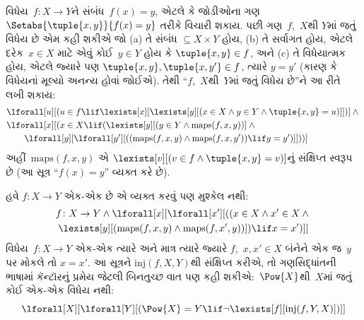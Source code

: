 વિધેય~$f\colon X\to Y$ને સંબંધ~$f(x)=y$, એટલે કે જોડીઓના ગણ
$\Setabs{\tuple{x,y}}{f(x)=y}$ તરીકે વિચારી શકાય. પછી ગણ~$f$,~$X$થી
$Y$માં જતું વિધેય છે એમ કહી શકીએ જો (a) તે સંબંધ
$\subseteq X\times Y$ હોય, (b) તે સર્વાગત હોય, એટલે દરેક~$x\in X$
માટે એવું કોઈ~$y\in Y$ હોય કે $\tuple{x,y}\in f$, અને (c) તે
વિધેયાત્મક હોય, એટલે જ્યારે પણ
$\tuple{x,y},\tuple{x,y'}\in f$, ત્યારે $y=y'$ (કારણ કે વિધેયનાં
મૂલ્યો અનન્ય હોવાં જોઈએ). તેથી ``$f$,~$X$થી~$Y$માં જતું વિધેય છે''ને
આ રીતે લખી શકાય:
\begin{align*}
& \lforall[u][(u \in f \lif
   \lexists[x][\lexists[y][(x \in X \land y \in
      Y \land \tuple{x, y} = u)]])] \land {}\\
& \lforall[x][(x \in X \lif
   (\lexists[y][(y \in Y \land \mathrm{maps}(f, x, y))] \land {}\\
&\qquad \lforall[y][\lforall[y'][((\mathrm{maps}(f, x, y) \land
    \mathrm{maps}(f, x, y')) \lif y = y')]]))]
\end{align*}
અહીં~$\mathrm{maps}(f,x,y)$ એ
$\lexists[v][(v\in f\land\tuple{x,y}=v)]$નું સંક્ષિપ્ત સ્વરૂપ છે (આ
સૂત્ર ``$f(x)=y$'' વ્યક્ત કરે છે).

હવે $f\colon X\to Y$ એક-એક છે એ વ્યક્ત કરવું પણ મુશ્કેલ નથી:
\begin{multline*}
 f \colon X \to Y \land \lforall[x][\lforall[x'][((x \in X \land x' \in
     X \land {} \\
 \lexists[y][(\mathrm{maps}(f, x, y) \land \mathrm{maps}(f,
        x', y))]) \lif x = x')]]
\end{multline*}
વિધેય~$f\colon X\to Y$ એક-એક ત્યારે અને માત્ર ત્યારે જ્યારે
$f$,~$x,x'\in X$ બંનેને એક જ~$y$ પર મોકલે તો $x=x'$. આ સૂત્રને
$\mathrm{inj}(f,X,Y)$થી સંક્ષિપ્ત કરીએ, તો ગણસિદ્ધાંતની ભાષામાં
કૅન્ટૉરનું પ્રમેય જેટલી બિનતુચ્છ વાત પણ કહી શકીએ:~$\Pow{X}$થી~$X$માં
જતું કોઈ એક-એક વિધેય નથી:
\[
\lforall[X][\lforall[Y][(\Pow{X} = Y \lif
    \lnot\lexists[f][\mathrm{inj}(f, Y, X)])]]
\]

